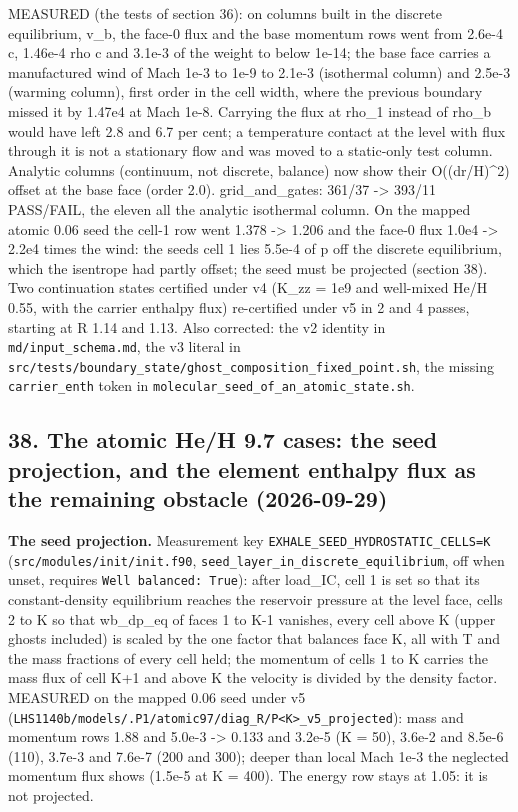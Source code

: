 \documentclass[english,a4paper]{my_memo}
\begin{document}
MEASURED (the tests of section 36): on columns built in the discrete
equilibrium, v\_b, the face-0 flux and the base momentum rows went from
2.6e-4 c, 1.46e-4 rho c and 3.1e-3 of the weight to below 1e-14; the base
face carries a manufactured wind of Mach 1e-3 to 1e-9 to 2.1e-3 (isothermal
column) and 2.5e-3 (warming column), first order in the cell width, where
the previous boundary missed it by 1.47e4 at Mach 1e-8. Carrying the flux at
rho\_1 instead of rho\_b would have left 2.8 and 6.7 per cent; a temperature
contact at the level with flux through it is not a stationary flow and was
moved to a static-only test column. Analytic columns (continuum, not
discrete, balance) now show their O((dr/H)\^{}2) offset at the base face
(order 2.0). grid\_and\_gates: 361/37 -\textgreater{} 393/11 PASS/FAIL, the eleven all the
analytic isothermal column. On the mapped atomic 0.06 seed the cell-1 row
went 1.378 -\textgreater{} 1.206 and the face-0 flux 1.0e4 -\textgreater{} 2.2e4 times the wind: the
seed\textquotesingle s cell 1 lies 5.5e-4 of p off the discrete equilibrium, which the
isentrope had partly offset; the seed must be projected (section 38). Two
continuation states certified under v4 (K\_zz = 1e9 and well-mixed He/H
0.55, with the carrier enthalpy flux) re-certified under v5 in 2 and 4
passes, starting at \textbar\textbar R\textbar\textbar{} 1.14 and 1.13. Also corrected: the v2 identity in
\texttt{md/input\_schema.md}, the v3 literal in
\texttt{src/tests/boundary\_state/ghost\_composition\_fixed\_point.sh}, the missing
\texttt{carrier\_enth} token in \texttt{molecular\_seed\_of\_an\_atomic\_state.sh}.

\subsection{38. The atomic He/H 9.7 cases: the seed projection, and the element enthalpy flux as the remaining obstacle (2026-09-29)}\label{38-the-atomic-heh-97-cases-the-seed-projection-and-the-element-enthalpy-flux-as-the-remaining-obstacle-2026-09-29}

\textbf{The seed projection.} Measurement key \texttt{EXHALE\_SEED\_HYDROSTATIC\_CELLS=K}
(\texttt{src/modules/init/init.f90}, \texttt{seed\_layer\_in\_discrete\_equilibrium}, off when
unset, requires \texttt{Well\ balanced:\ True}): after load\_IC, cell 1 is set so that
its constant-density equilibrium reaches the reservoir pressure at the level
face, cells 2 to K so that wb\_dp\_eq of faces 1 to K-1 vanishes, every cell
above K (upper ghosts included) is scaled by the one factor that balances
face K, all with T and the mass fractions of every cell held; the momentum
of cells 1 to K carries the mass flux of cell K+1 and above K the velocity
is divided by the density factor. MEASURED on the mapped 0.06 seed under v5
(\texttt{LHS1140b/models/.P1/atomic97/diag\_R/P\textless{}K\textgreater{}\_v5\_projected}): mass and momentum
rows 1.88 and 5.0e-3 -\textgreater{} 0.133 and 3.2e-5 (K = 50), 3.6e-2 and 8.5e-6 (110),
3.7e-3 and 7.6e-7 (200 and 300); deeper than local Mach 1e-3 the neglected
momentum flux shows (1.5e-5 at K = 400). The energy row stays at 1.05: it is
not projected.
\end{document}
